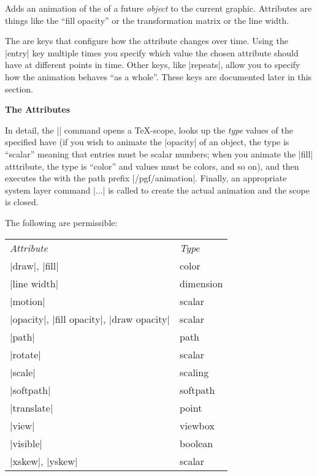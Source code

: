 \begin{command}{\pgfanimateattribute{}}
  Adds an animation of the  of a future \emph{object}
  to the current graphic. Attributes are things like the ``fill
  opacity'' or the transformation matrix or the line width.

  The  are keys that configure how the attribute changes
  over time. Using the |entry| key multiple times you specify which
  value the chosen attribute should have at different points in
  time. Other keys, like |repeats|, allow you to specify how the
  animation behaves ``as a whole''. These keys are documented later in
  this section.

\begin{codeexample}[]
\end{codeexample}

  \medskip
  \textbf{The Attributes}
  
  In detail, the |\pgfanimateattribute| command opens a \TeX-scope,
  looks up the \emph{type} values of the specified 
  have (if you wish to animate the |opacity| of an object, the type is
  ``scalar'' meaning that entries must be scalar numbers; when you
  animate the |fill| atttribute, the type is ``color'' and values 
  must be colors, and so on), and then executes the  with
  the path prefix |/pgf/animation|. Finally, an appropriate system
  layer command |\pgfsysanimate...| is called to create the actual
  animation and the scope is closed.

  The following  are permissible:
  
  \begin{tabular}{ll}
    \emph{Attribute} & \emph{Type} \\
    |draw|, |fill|              & color \\
    |line width|                & dimension \\
    |motion|                    & scalar \\
    |opacity|, |fill opacity|, |draw opacity|              & scalar \\
    |path|                      & path \\
    |rotate|                    & scalar \\
    |scale|                     & scaling \\
    |softpath|                  & softpath \\
    |translate|                 & point \\
    |view|                      & viewbox \\
    |visible|                   & boolean \\
    |xskew|, |yskew|            & scalar \\
  \end{tabular}


\end{command}
